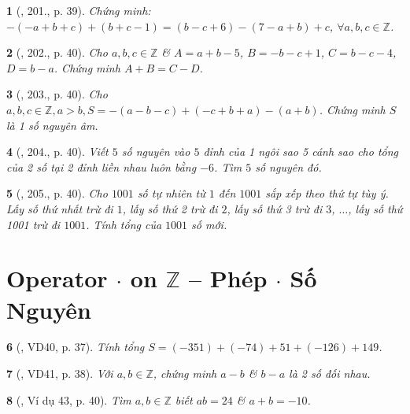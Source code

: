 \documentclass{article}
\newtheorem{baitoan}{}
\begin{document}
\begin{baitoan}[\cite{Tuyen_Toan_6}, 201., p. 39]
	Chứng minh: $-(-a + b + c) + (b + c - 1) = (b - c + 6) - (7 - a + b) + c$, $\forall a,b,c\in\mathbb{Z}$.
\end{baitoan}

\begin{baitoan}[\cite{Tuyen_Toan_6}, 202., p. 40]
	Cho $a,b,c\in\mathbb{Z}$ \& $A = a + b - 5$, $B = -b - c + 1$, $C = b - c - 4$, $D = b - a$. Chứng minh $A + B = C - D$.
\end{baitoan}

\begin{baitoan}[\cite{Tuyen_Toan_6}, 203., p. 40]
	Cho $a,b,c\in\mathbb{Z},a > b,S = -(a - b - c) + (-c + b + a) - (a + b)$. Chứng minh $S$ là 1 số nguyên âm.
\end{baitoan}

\begin{baitoan}[\cite{Tuyen_Toan_6}, 204., p. 40]
	Viết $5$ số nguyên vào $5$ đỉnh của 1 ngôi sao 5 cánh sao cho tổng của 2 số tại 2 đỉnh liền nhau luôn bằng $-6$. Tìm $5$ số nguyên đó.
\end{baitoan}

\begin{baitoan}[\cite{Tuyen_Toan_6}, 205., p. 40]
	Cho $1001$ số tự nhiên từ $1$ đến $1001$ sắp xếp theo thứ tự tùy ý. Lấy số thứ nhất trừ đi $1$, lấy số thứ 2 trừ đi $2$, lấy số thứ 3 trừ đi $3$, $\ldots$, lấy số thứ 1001 trừ đi $1001$. Tính tổng của $1001$ số mới.
\end{baitoan}


\section{Operator $\cdot$ on $\mathbb{Z}$ -- Phép $\cdot$ Số Nguyên}

\begin{baitoan}[\cite{Tuyen_Toan_6}, VD40, p. 37]
	Tính tổng $S = (-351) + (-74) + 51 + (-126) + 149$.
\end{baitoan}

\begin{baitoan}[\cite{Tuyen_Toan_6}, VD41, p. 38]
	Với $a,b\in\mathbb{Z}$, chứng minh $a - b$ \& $b - a$ là 2 số đối nhau.
\end{baitoan}

\begin{baitoan}[\cite{Tuyen_Toan_6}, Ví dụ 43, p. 40]
	Tìm $a,b\in\mathbb{Z}$ biết $ab = 24$ \& $a + b = -10$.
\end{baitoan}
\end{document}
